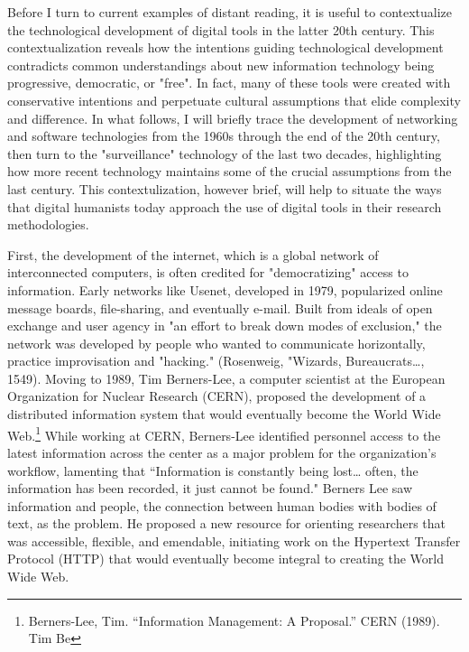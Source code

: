 \documentclass[11pt]{article}
\begin{document}
Before I turn to current examples of distant reading, it is useful to
contextualize the technological development of digital tools in the
latter 20th century. This contextualization reveals how the intentions
guiding technological development contradicts common understandings
about new information technology being progressive, democratic, or
"free". In fact, many of these tools were created with conservative
intentions and perpetuate cultural assumptions that elide complexity
and difference. In what follows, I will briefly trace the development
of networking and software technologies from the 1960s through the end
of the 20th century, then turn to the "surveillance" technology of the
last two decades, highlighting how more recent technology maintains
some of the crucial assumptions from the last century. This
contextulization, however brief, will help to situate the ways that
digital humanists today approach the use of digital tools in their
research methodologies.

First, the development of the internet, which is a global network of
interconnected computers, is often credited for "democratizing" access
to information. Early networks like Usenet, developed in 1979,
popularized online message boards, file-sharing, and eventually
e-mail. Built from ideals of open exchange and user agency in "an
effort to break down modes of exclusion," the network was developed by
people who wanted to communicate horizontally, practice improvisation
and "hacking." (Rosenweig, "Wizards, Bureaucrats\ldots{}, 1549). Moving to
1989, Tim Berners-Lee, a computer scientist at the European
Organization for Nuclear Research (CERN), proposed the development of
a distributed information system that would eventually become the
World Wide Web.\footnote{Berners-Lee, Tim. “Information Management: A Proposal.” CERN (1989).
Tim Be} While working at CERN, Berners-Lee identified
personnel access to the latest information across the center as a
major problem for the organization’s workflow, lamenting that
“Information is constantly being lost… often, the information has been
recorded, it just cannot be found." Berners Lee saw information and
people, the connection between human bodies with bodies of text, as
the problem. He proposed a new resource for orienting researchers that
was accessible, flexible, and emendable, initiating work on the
Hypertext Transfer Protocol (HTTP) that would eventually become
integral to creating the World Wide Web.
\end{document}
